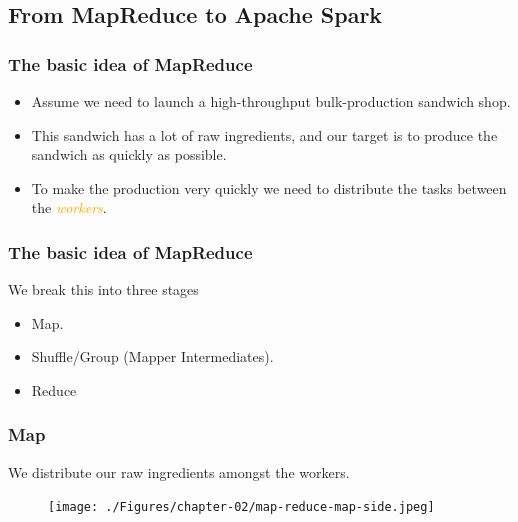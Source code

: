 \subsection{From MapReduce to Apache Spark}

\begin{frame}
	\frametitle{The basic idea of MapReduce}
	\begin{itemize}  [<+->]
		\item Assume we need to launch a high-throughput bulk-production sandwich shop.
		\item This sandwich has a lot of raw ingredients, and our target is to produce the sandwich as quickly as possible.
		\item To make the production very quickly we need to distribute the tasks between the  \textcolor{orange}{\textit{workers}}.
	\end{itemize}
\end{frame}
\begin{frame}
	\frametitle{The basic idea of MapReduce}
	We break this into three stages
	\begin{itemize}  [<+->]
		\item Map.
		\item Shuffle/Group (Mapper Intermediates).
		\item Reduce
	\end{itemize}
\end{frame}
\begin{frame}
	\frametitle{Map}
	We distribute our raw ingredients amongst the workers.
	\begin{figure}
		\texttt{[image: ./Figures/chapter-02/map-reduce-map-side.jpeg]}
	\end{figure}
\end{frame}
